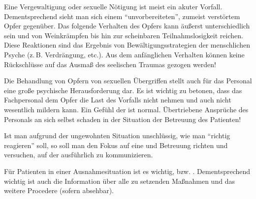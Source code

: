 

{Eine Vergewaltigung oder sexuelle Nötigung ist meist ein
akuter Vorfall. Dementsprechend sieht man sich einem
\enquote{unvorbereiteten}, zumeist verstörtem Opfer gegenüber. Das
folgende Verhalten des Opfers kann äußerst unterschiedlich
sein und von Weinkrämpfen bis hin zur scheinbaren
Teilnahmslosigkeit reichen. Diese Reaktionen sind das
Ergebnis von Bewältigungsstrategien der menschlichen Psyche
(z.\,B. Verdrängung, etc.).
 Aus dem anfänglichen Verhalten können keine
Rückschlüsse auf das Ausmaß des seelischen Traumas
gezogen werden!}
{}
{}
{}
{}



{Die Behandlung von Opfern von sexuellen Übergriffen stellt
auch für das Personal eine große psychische Herausforderung
dar. Es ist wichtig zu betonen, dass das Fachpersonal dem
Opfer die Last des Vorfalls nicht nehmen und auch nicht
wesentlich mildern kann. Ein Gefühl der  ist normal. Übertriebene Ansprüche des
Personals an sich selbst schaden in der Situation der
Betreuung des Patienten!
}
{}
{}
{}
{}

{Ist man aufgrund der ungewohnten Situation unschlüssig, wie
man \enquote{richtig reagieren} soll, so soll man den Fokus auf
eine  und  Betreuung richten und
versuchen, auf der  ausführlich zu
kommunizieren. 

Für Patienten in einer Ausnahmesituation ist es wichtig,
 bzw.
. Dementsprechend wichtig
ist auch die Information über alle zu setzenden 
Maßnahmen und das weitere Procedere (sofern absehbar). }
{}
{}
{}
{}


